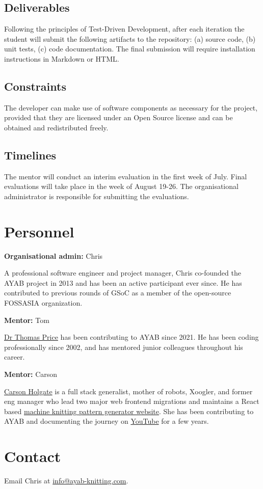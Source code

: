 \documentclass{article}
\begin{document}
\subsection{Deliverables}
Following the principles of Test-Driven Development, after each iteration the student will submit the following artifacts to the repository: (a) source code, (b) unit tests, (c) code documentation. The final submission will require installation instructions in Markdown or HTML.

\subsection{Constraints}
The developer can make use of software components as necessary for the project, provided that they are licensed under an Open Source license and can be obtained and redistributed freely.

\subsection{Timelines}
The mentor will conduct an interim evaluation in the first week of July. Final evaluations will take place in the week of August 19-26. The organisational administrator is responsible for submitting the evaluations.


\section{Personnel}

\textbf{Organisational admin:} Chris

A professional software engineer and project manager, Chris co-founded the AYAB project in 2013 and has been an active participant ever since. He has contributed to previous rounds of GSoC as a member of the open-source FOSSASIA organization.

\textbf{Mentor:} Tom

\href{https://t0mpr1c3.github.io/}{Dr Thomas Price} has been contributing to AYAB since 2021. He has been coding professionally since 2002, and has mentored junior colleagues throughout his career.

\textbf{Mentor:} Carson

\href{https://www.linkedin.com/in/carson-holgate/}{Carson Holgate} is a full stack generalist, mother of robots, Xoogler, and former eng manager who lead two major web frontend migrations and maintains a React based \href{https://www.abstractknitfactoryfactory.com/}{machine knitting pattern generator website}. She has been contributing to AYAB and documenting the journey on \href{https://www.youtube.com/channel/UCjSd0-rGqU2NPy_iSuCqUpw/}{YouTube} for a few years.

\section{Contact}

Email Chris at \href{mailto:info@ayab-knitting.com}{info@ayab-knitting.com}.
\end{document}
